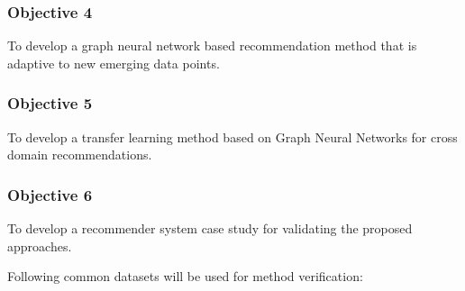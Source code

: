 

\subsubsection*{Objective 4}
To develop a graph neural network based recommendation method that is adaptive to new emerging data points.



\subsubsection*{Objective 5}
To develop a transfer learning method based on Graph Neural Networks for cross domain recommendations.



\subsubsection*{Objective 6}
To develop a recommender system case study for validating the proposed approaches.

Following common datasets will be used for method verification: 

